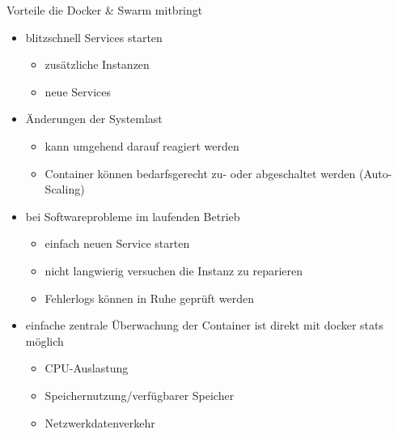 \documentclass[final]{beamer}
\newlength{\onecolwid}
\begin{document}
\begin{frame}
\begin{columns}[t]
\begin{column}{\onecolwid}
\begin{block}{Vorteile die Docker \& Swarm mitbringt}
\begin{itemize}
	\item blitzschnell Services starten
	\begin{itemize}
\item zusätzliche Instanzen
\item neue Services
\end{itemize}
\item Änderungen der Systemlast
\begin{itemize}
\item kann umgehend darauf reagiert werden
\item Container können bedarfsgerecht  zu- oder abgeschaltet werden (Auto-Scaling)
\end{itemize}
\item bei Softwareprobleme im laufenden Betrieb
\begin{itemize}
\item einfach neuen Service starten
\item nicht langwierig versuchen die Instanz zu reparieren
\item Fehlerlogs können in Ruhe geprüft werden
\end{itemize}
\item einfache zentrale Überwachung der Container ist direkt mit docker stats möglich
\begin{itemize}
\item CPU-Auslastung
\item Speichernutzung/verfügbarer Speicher
\item Netzwerkdatenverkehr
\end{itemize}
\end{itemize}



\end{block}
\end{column}
\end{columns}
\end{frame}
\end{document}
